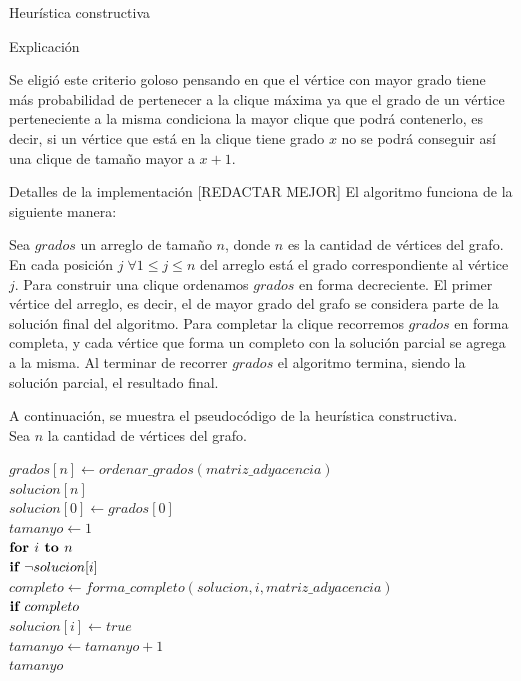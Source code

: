 \begin{section}{Heurística constructiva}
\begin{subsection}{Explicación}

			Se eligió este criterio goloso pensando en que el vértice con mayor grado tiene más probabilidad de pertenecer a la clique máxima ya que el grado de un vértice perteneciente a la misma condiciona la mayor clique que podrá contenerlo, es decir, si un vértice que está en la clique tiene grado $x$ no se podrá conseguir así una clique de tamaño mayor a $x+1$.
		\end{subsection}
		\begin{subsection}{Detalles de la implementación}
			[REDACTAR MEJOR]
			El algoritmo funciona de la siguiente manera:

			Sea $grados$ un arreglo de tamaño $n$, donde $n$ es la cantidad de vértices del grafo. En cada posición $j\; \forall 	1\leq j \leq n$ del arreglo está el grado correspondiente al vértice $j$.
			Para construir una clique ordenamos $grados$ en forma decreciente. El primer vértice del arreglo, es decir, el de mayor grado del grafo se considera parte de la solución final del algoritmo.
			Para completar la clique recorremos $grados$ en forma completa, y cada vértice que forma un completo con la solución parcial se agrega a la misma.
			Al terminar de recorrer $grados$ el algoritmo termina, siendo la solución parcial, el resultado final.

			A continuación, se muestra el pseudocódigo de la heurística constructiva.\\

			Sea $n$ la cantidad de vértices del grafo.

			\begin{pseudo}
				\tab $grados[n] \leftarrow ordenar\_grados(matriz\_adyacencia)$\\
				\tab $solucion[n]$\\
				\tab $solucion[0] \leftarrow grados[0]$\\
				\tab $tamanyo \leftarrow 1$\\
				\tab $\textbf{for } i \textbf{ to } n$\\
				\tab \tab $\textbf{if } \neg solucion[i]$\\
				\tab \tab \tab $completo \leftarrow forma\_completo(solucion,i,matriz\_adyacencia)$\\
				\tab \tab \tab $\textbf{if } completo$\\
				\tab \tab \tab \tab $solucion[i] \leftarrow true$\\
				\tab \tab \tab \tab $tamanyo \leftarrow tamanyo + 1$\\
				\RET $tamanyo$\\
			\end{pseudo}


\end{subsection}
\end{section}
